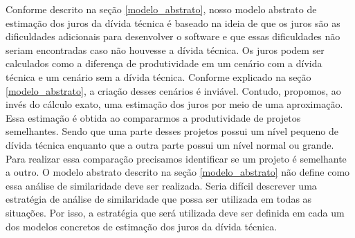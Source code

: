Conforme descrito na seção \ref{modelo_abstrato}, nosso modelo abstrato de estimação dos juros da dívida técnica é baseado na ideia de que os juros são as dificuldades adicionais para desenvolver o software e que essas dificuldades não seriam encontradas caso não houvesse a dívida técnica. Os juros podem ser calculados como a diferença de produtividade em um cenário com a dívida técnica e um cenário sem a dívida técnica. Conforme explicado na seção \ref{modelo_abstrato}, a criação desses cenários é inviável. Contudo, propomos, ao invés do cálculo exato, uma estimação dos juros por meio de uma aproximação. Essa estimação é obtida ao compararmos a produtividade de projetos semelhantes. Sendo que uma parte desses projetos possui um nível pequeno de dívida técnica enquanto que a outra parte possui um nível normal ou grande.  Para realizar essa comparação precisamos identificar se um projeto é semelhante a outro. O modelo abstrato descrito na seção \ref{modelo_abstrato} não define como essa análise de similaridade deve ser realizada. Seria difícil descrever uma estratégia de análise de similaridade que possa ser utilizada em todas as situações. Por isso, a estratégia que será utilizada deve ser definida em cada um dos modelos concretos de estimação dos juros da dívida técnica.


